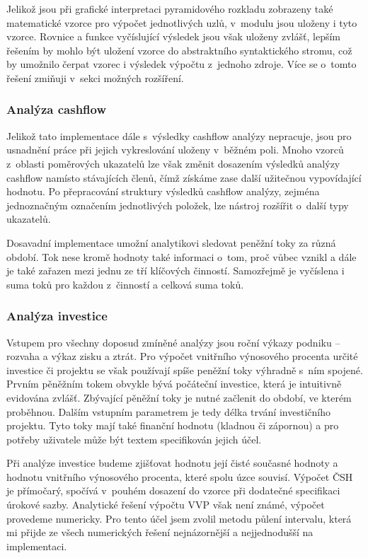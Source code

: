 Jelikož jsou při grafické interpretaci pyramidového rozkladu zobrazeny také matematické vzorce pro výpočet jednotlivých uzlů, v~modulu jsou uloženy i tyto vzorce. Rovnice a funkce vyčíslující výsledek jsou však uloženy zvlášť, lepším řešením by mohlo být uložení vzorce do abstraktního syntaktického stromu, což by umožnilo čerpat vzorec i výsledek výpočtu z~jednoho zdroje. Více se o~tomto řešení zmiňuji v~sekci možných rozšíření.

\subsubsection{Analýza cashflow}
Jelikož tato implementace dále s~výsledky cashflow analýzy nepracuje, jsou pro usnadnění práce při jejich vykreslování uloženy v~běžném poli. Mnoho vzorců z~oblasti poměrových ukazatelů lze však změnit dosazením výsledků analýzy cashflow namísto stávajících členů, čímž získáme zase další užitečnou vypovídající hodnotu. Po přepracování struktury výsledků cashflow analýzy, zejména jednoznačným označením jednotlivých položek, lze nástroj rozšířit o~další typy ukazatelů.

Dosavadní implementace umožní analytikovi sledovat peněžní toky za různá období. Tok nese kromě hodnoty také informaci o~tom, proč vůbec vznikl a dále je také zařazen mezi jednu ze tří klíčových činností. Samozřejmě je vyčíslena i suma toků pro každou z~činností a celková suma toků.

\subsubsection{Analýza investice}
\label{irr}
Vstupem pro všechny doposud zmíněné analýzy jsou roční výkazy podniku -- rozvaha a výkaz zisku a ztrát. Pro výpočet vnitřního výnosového procenta určité investice či projektu se však používají spíše peněžní toky výhradně s~ním spojené. Prvním pěněžním tokem obvykle bývá počáteční investice, která je intuitivně evidována zvlášť. Zbývající pěněžní toky je nutné začlenit do období, ve kterém proběhnou. Dalším vstupním parametrem je tedy délka trvání investičního projektu. Tyto toky mají také finanční hodnotu (kladnou či zápornou) a pro potřeby uživatele může být textem specifikován jejich účel.

Při analýze investice budeme zjišťovat hodnotu její čisté současné hodnoty a hodnotu vnitřního výnosového procenta, které spolu úzce souvisí. Výpočet ČSH je přímočarý, spočívá v~pouhém dosazení do vzorce při dodatečné specifikaci úrokové sazby. Analytické řešení výpočtu VVP však není známé, výpočet provedeme numericky. Pro tento účel jsem zvolil metodu půlení intervalu, která mi přijde ze všech numerických řešení nejnázornější a nejjednodušší na implementaci. 

